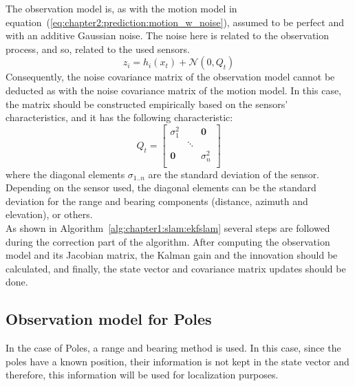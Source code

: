 The observation model is, as with the motion model in equation~(\ref{eq:chapter2:prediction:motion_w_noise}), assumed to be perfect and with an additive Gaussian noise. The noise here is related to the observation process, and so, related to the used sensors.
\begin{equation}
    z_i = h_i\left(x_t\right) + \mathcal{N}\left(0, Q_t\right)
    \label{eq:chapter2:correction:obs_w_noise}
\end{equation}
Consequently, the noise covariance matrix of the observation model cannot be deducted as with the noise covariance matrix of the motion model. In this case, the matrix should be constructed empirically based on the sensors' characteristics, and it has the following characteristic:
\begin{equation}
    Q_t = \begin{bmatrix}
        \sigma_1^2 &  & \textbf{0} \\
         & \ddots & \\
        \textbf{0} & & \sigma_n^2 \\
    \end{bmatrix}
\end{equation}
where the diagonal elements $\sigma_{1..n}$ are the standard deviation of the sensor. Depending on the sensor used, the diagonal elements can be the standard deviation for the range and bearing components (distance, azimuth and elevation), or others.\\

As shown in Algorithm~\ref{alg:chapter1:slam:ekfslam} several steps are followed during the correction part of the algorithm. After computing the observation model and its Jacobian matrix, the Kalman gain and the innovation should be calculated, and finally, the state vector and covariance matrix updates should be done.

\subsection{Observation model for Poles}
\label{subsec:chapter2:correction:poles}
In the case of Poles, a range and bearing method is used. In this case, since the poles have a known position, their information is not kept in the state vector and therefore, this information will be used for localization purposes.\\

